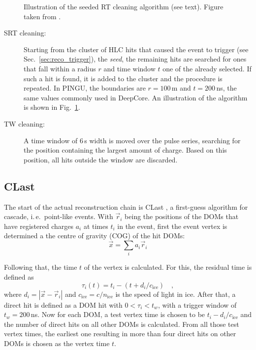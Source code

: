 \begin{figure}
\centering
  \caption{Illustration of the seeded RT cleaning algorithm (see text). Figure
    taken from \cite{SRT}.}
\label{fig:SRTcleaning}
\end{figure}

\begin{description}
 \item[SRT cleaning:] Starting from the cluster of HLC hits that caused the
  event to trigger (see Sec.~\ref{sec:reco_trigger}), the \emph{seed}, the
  remaining hits are searched for ones that fall within a radius $r$ and time
  window $t$ \wrt one of the already selected. If such a hit is found, it is
  added to the cluster and the procedure is repeated. In PINGU, the boundaries
  are $r=100$\,m and $t=200$\,ns, the same values commonly used in DeepCore.
  An illustration of the algorithm is shown in Fig.~\ref{fig:SRTcleaning}.
 \item[TW cleaning:] A time window of 6\,\textmu s width is moved over the pulse
  series, searching for the position containing the largest amount of charge.
  Based on this position, all hits outside the window are discarded.
\end{description}


\subsection{CLast}
\label{sec:reco_clast}

The start of the actual reconstruction chain is CLast \cite{CLast}, a
first-guess algorithm for cascade, i.\,e.\ point-like events. With $\vec{r}_i$
being the positions of the DOMs that have registered charges $a_i$ at times
$t_i$ in the event, first the event vertex is determined a the centre of gravity
(COG) of the hit DOMs:
\begin{equation}
 \vec{x} = \sum_i a_i \vec{r}_i
\end{equation}

Following that, the time $t$ of the vertex is calculated. For this, the residual
time is defined as
\begin{equation}
 \tau_i(t) = t_i - \left( t + d_i/c_\mathrm{ice} \right) \quad,
\end{equation}
where $d_i = | \vec{x} - \vec{r}_i |$ and $c_\mathrm{ice} = c/n_\mathrm{ice}$ is
the speed of light in ice. After that, a direct hit is defined as a DOM hit
with $0 < \tau_i < t_w$, with a trigger window of $t_w = 200$\,ns. Now for each
DOM, a test vertex time is chosen to be $t_i - d_i/c_\mathrm{ice}$ and the
number of direct hits on all other DOMs is calculated. From all those test
vertex times, the earliest one resulting in more than four direct hits on other
DOMs is chosen as the vertex time $t$.

